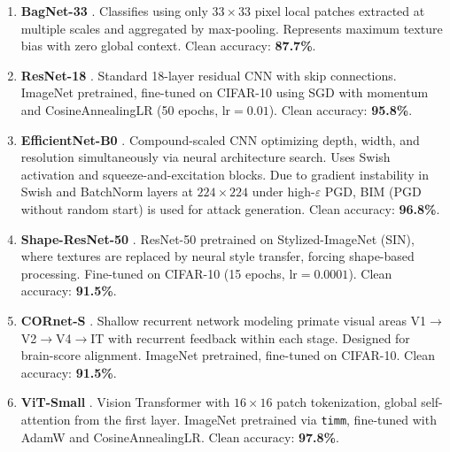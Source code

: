 \documentclass[12pt,a4paper]{article}
\begin{document}
\begin{enumerate}[leftmargin=1.5em]

  \item \textbf{BagNet-33} \citep{brendel2019approximating}.
        Classifies using only $33{\times}33$ pixel local patches
        extracted at multiple scales and aggregated by max-pooling.
        Represents maximum texture bias with zero global context.
        Clean accuracy: \textbf{87.7\%}.

  \item \textbf{ResNet-18} \citep{he2016deep}.
        Standard 18-layer residual CNN with skip connections.
        ImageNet pretrained, fine-tuned on CIFAR-10 using SGD with
        momentum and CosineAnnealingLR (50 epochs, $\text{lr}{=}0.01$).
        Clean accuracy: \textbf{95.8\%}.

  \item \textbf{EfficientNet-B0} \citep{tan2019efficientnet}.
        Compound-scaled CNN optimizing depth, width, and resolution
        simultaneously via neural architecture search. Uses Swish
        activation and squeeze-and-excitation blocks. Due to gradient
        instability in Swish and BatchNorm layers at
        $224{\times}224$ under high-$\varepsilon$ PGD, BIM (PGD
        without random start) is used for attack generation.
        Clean accuracy: \textbf{96.8\%}.

  \item \textbf{Shape-ResNet-50} \citep{geirhos2019imagenet}.
        ResNet-50 pretrained on Stylized-ImageNet (SIN), where
        textures are replaced by neural style transfer, forcing
        shape-based processing. Fine-tuned on CIFAR-10 (15 epochs,
        $\text{lr}{=}0.0001$). Clean accuracy: \textbf{91.5\%}.

  \item \textbf{CORnet-S} \citep{kubilius2019brain}.
        Shallow recurrent network modeling primate visual areas
        V1$\to$V2$\to$V4$\to$IT with recurrent feedback within each
        stage. Designed for brain-score alignment. ImageNet pretrained,
        fine-tuned on CIFAR-10. Clean accuracy: \textbf{91.5\%}.

  \item \textbf{ViT-Small} \citep{dosovitskiy2020image}.
        Vision Transformer with $16{\times}16$ patch tokenization,
        global self-attention from the first layer. ImageNet pretrained
        via \texttt{timm}, fine-tuned with AdamW and
        CosineAnnealingLR. Clean accuracy: \textbf{97.8\%}.


\end{enumerate}
\end{document}
